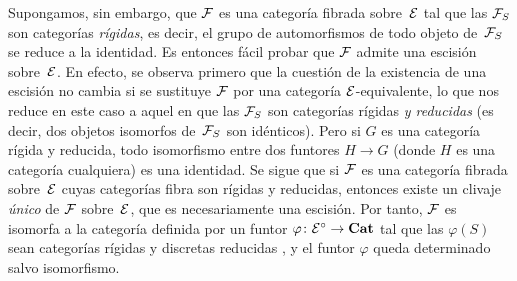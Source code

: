 Supongamos, sin embargo, que $\cal{F}$ es una categoría fibrada
sobre~$\cal{E}$ tal que las
$\cal{F}_S$ son categorías \emph{rígidas}, es decir, el grupo de
automorfismos de todo objeto de~$\cal{F}_S$ se reduce a la identidad. Es
entonces fácil probar que $\cal{F}$ admite una escisión sobre~$\cal{E}$.
En efecto, se observa primero que la cuestión de la existencia de una
escisión no cambia si se sustituye $\cal{F}$ por una categoría
$\cal{E}$-equivalente, lo que nos reduce en este caso a aquel en que las
$\cal{F}_S$ son categorías rígidas \emph{y reducidas} (es decir, dos
objetos isomorfos de~$\cal{F}_S$ son idénticos). Pero si $G$ es una
categoría rígida y reducida, todo isomorfismo entre dos funtores $H\to G$
(donde $H$ es una categoría cualquiera) es una identidad. Se sigue que si
$\cal{F}$ es una categoría fibrada sobre~$\cal{E}$ cuyas categorías fibra
son rígidas y reducidas, entonces existe un clivaje \emph{único} de
$\cal{F}$ sobre~$\cal{E}$, que es necesariamente una escisión. Por tanto,
$\cal{F}$ es isomorfa a la categoría definida por un funtor
$\varphi\colon \cal{E}^\circ\to \Cat$ tal que las $\varphi(S)$ sean
categorías rígidas y
{discretas}
{reducidas}
, y el funtor $\varphi$ queda determinado salvo isomorfismo.
